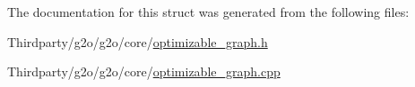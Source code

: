 The documentation for this struct was generated from the following files\+:\begin{DoxyCompactItemize}
\item 
Thirdparty/g2o/g2o/core/\mbox{\hyperlink{optimizable__graph_8h}{optimizable\+\_\+graph.\+h}}\item 
Thirdparty/g2o/g2o/core/\mbox{\hyperlink{optimizable__graph_8cpp}{optimizable\+\_\+graph.\+cpp}}\end{DoxyCompactItemize}
